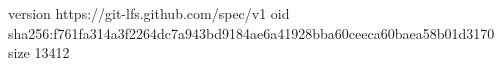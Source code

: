 version https://git-lfs.github.com/spec/v1
oid sha256:f761fa314a3f2264dc7a943bd9184ae6a41928bba60ceeca60baea58b01d3170
size 13412
